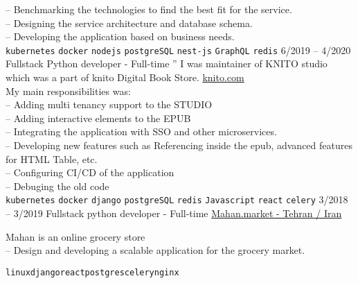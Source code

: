 \documentclass[9pt]{developercv}
\begin{document}
\begin{entrylist}
{		-- Benchmarking the technologies to find the best fit for the service. \\
		-- Designing the service architecture and database schema. \\
		-- Developing the application based on business needs. \\
		\texttt{kubernetes}\slashsep
		\texttt{docker}\slashsep
		\texttt{nodejs}\slashsep
		\texttt{postgreSQL}\slashsep
		\texttt{nest-js}\slashsep
		\texttt{GraphQL}\slashsep
		\texttt{redis}\slashsep
	}
	\entry
	{6/2019 -- 4/2020}
	{Fullstack Python developer - Full-time}
	{''}
	{
		I was maintainer of KNITO studio which was a part of knito Digital Book Store.
		\href{https://knito.com/}{knito.com} \\
		My main responsibilities was: \\
		-- Adding multi tenancy support to the STUDIO \\
		-- Adding interactive elements to the EPUB \\
		-- Integrating the application with SSO and other microservices. \\
		-- Developing new features such as Referencing inside the epub, advanced features for HTML Table, etc. \\
		-- Configuring CI/CD of the application \\
		-- Debuging the old code \\
		\texttt{kubernetes}\slashsep
		\texttt{docker}\slashsep
		\texttt{django}\slashsep
		\texttt{postgreSQL}\slashsep
		\texttt{redis}\slashsep
		\texttt{Javascript}\slashsep
		\texttt{react}\slashsep
		\texttt{celery}
	}
	\entry
	{3/2018 -- 3/2019}
	{Fullstack python developer - Full-time}
	{\href{https://mahan.market/}{Mahan.market - Tehran / Iran}}
	{Mahan is an online grocery store \\
		-- Design and developing a scalable application for the grocery market.

		\texttt{linux}\slashsep\texttt{django}\slashsep\texttt{react}\slashsep\texttt{postgres}\slashsep\texttt{celery}\slashsep\texttt{nginx}}
\end{entrylist}

\end{document}
